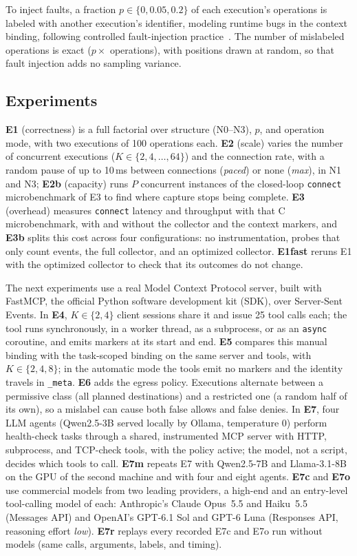 To inject faults, a fraction $p \in \{0, 0.05, 0.2\}$ of each execution's operations is labeled with another execution's identifier, modeling runtime bugs in the context binding, following controlled fault-injection practice~\cite{arlat1990fault,hsueh1997fault}. The number of mislabeled operations is exact ($p \times$ operations), with positions drawn at random, so that fault injection adds no sampling variance.

\subsection{Experiments}
\textbf{E1} (correctness) is a full factorial over structure (N0--N3), $p$, and operation mode, with two executions of 100 operations each. \textbf{E2} (scale) varies the number of concurrent executions ($K \in \{2,4,\dots,64\}$) and the connection rate, with a random pause of up to 10\,ms between connections (\emph{paced}) or none (\emph{max}), in N1 and N3; \textbf{E2b} (capacity) runs $P$ concurrent instances of the closed-loop \texttt{connect} microbenchmark of E3 to find where capture stops being complete. \textbf{E3} (overhead) measures \texttt{connect} latency and throughput with that C microbenchmark, with and without the collector and the context markers, and \textbf{E3b} splits this cost across four configurations: no instrumentation, probes that only count events, the full collector, and an optimized collector. \textbf{E1fast} reruns E1 with the optimized collector to check that its outcomes do not change.

The next experiments use a real Model Context Protocol server, built with FastMCP, the official Python software development kit (SDK), over Server-Sent Events. In \textbf{E4}, $K \in \{2,4\}$ client sessions share it and issue 25 tool calls each; the tool runs synchronously, in a worker thread, as a subprocess, or as an \texttt{async} coroutine, and emits markers at its start and end. \textbf{E5} compares this manual binding with the task-scoped binding on the same server and tools, with $K \in \{2,4,8\}$; in the automatic mode the tools emit no markers and the identity travels in \texttt{\_meta}. \textbf{E6} adds the egress policy. Executions alternate between a permissive class (all planned destinations) and a restricted one (a random half of its own), so a mislabel can cause both false allows and false denies. In \textbf{E7}, four LLM agents (Qwen2.5-3B served locally by Ollama, temperature 0) perform health-check tasks through a shared, instrumented MCP server with HTTP, subprocess, and TCP-check tools, with the policy active; the model, not a script, decides which tools to call. \textbf{E7m} repeats E7 with Qwen2.5-7B and Llama-3.1-8B on the GPU of the second machine and with four and eight agents. \textbf{E7c} and \textbf{E7o} use commercial models from two leading providers, a high-end and an entry-level tool-calling model of each: Anthropic's Claude Opus~5.5 and Haiku~5.5 (Messages API) and OpenAI's GPT-6.1 Sol and GPT-6 Luna (Responses API, reasoning effort \emph{low}). \textbf{E7r} replays every recorded E7c and E7o run without models (same calls, arguments, labels, and timing).

